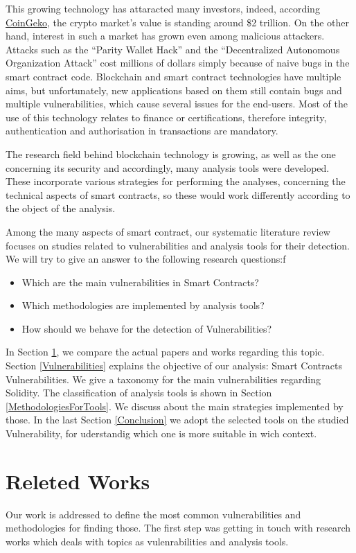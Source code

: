 \documentclass[a4paper,sigconf, language=french,
language=german, language=spanish, language=english]{acmart}
\begin{document}
This growing technology has attaracted many investors, indeed, according \href{https://www.coingecko.com/}{CoinGeko}, 
the crypto market's value is standing around \$2 trillion.
On the other hand, interest in such a market has grown even among malicious attackers. 
Attacks such as the “Parity Wallet Hack” and the “Decentralized Autonomous Organization Attack” cost millions of dollars simply because of 
naive bugs in the smart contract code. Blockchain and smart contract technologies have multiple aims, but unfortunately, new applications 
based on them still contain bugs and multiple vulnerabilities, which cause 
several issues for the end-users. Most of the use of this technology relates to finance or certifications, therefore integrity, 
authentication and authorisation in transactions are mandatory. 

The research field behind blockchain technology is growing, as well as the one concerning 
its security and accordingly, many analysis tools were developed. 
These incorporate various strategies for performing the analyses, concerning the technical aspects of smart contracts, 
so these would work differently according to the object of the analysis. 

Among the many aspects of smart contract, our systematic
literature review focuses on studies related to vulnerabilities and 
analysis tools for their detection. We will try to give an answer to the following 
research questions:f
\begin{itemize}
    \item Which are the main vulnerabilities in Smart Contracts?
    \item Which methodologies are implemented by analysis tools?
    \item How should we behave for the detection of Vulnerabilities?
\end{itemize}

In Section \ref{RelatedWorks}, we compare the actual papers and works regarding this topic. 
Section \ref{Vulnerabilities} explains the objective of our analysis: Smart Contracts Vulnerabilities. 
We give a taxonomy for the main vulnerabilities regarding Solidity. The classification of analysis tools 
is shown in Section \ref{MethodologiesForTools}. We discuss about the main strategies implemented by those.
In the last Section \ref{Conclusion} we adopt the selected tools on the studied Vulnerability, for uderstandig which one is 
more suitable in wich context. 


\section{Releted Works}
\label{RelatedWorks}
Our work is addressed to define the most common vulnerabilities and methodologies for finding those.
The first step was getting in touch with research works which deals with topics as vulenrabilities and analysis tools. 
\end{document}
